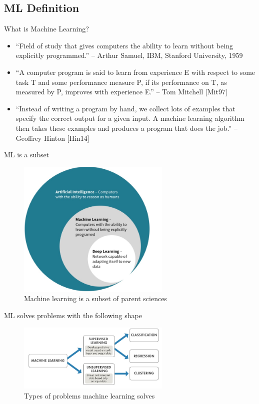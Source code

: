 \documentclass{beamer}
\begin{document}
\subsection{ML Definition}
\begin{frame}{What is Machine Learning?}
\begin{itemize}
\justifying
\item “Field of study that gives computers the ability to learn without
being explicitly programmed.” – Arthur Samuel, IBM, Stanford
University, 1959

\item “A computer program is said to learn from experience E with
respect to some task T and some performance measure P, if its
performance on T, as measured by P, improves with experience E.”
– Tom Mitchell [Mit97]

\item “Instead of writing a program by hand, we collect lots of examples
that specify the correct output for a given input. A machine
learning algorithm then takes these examples and produces a
program that does the job.” – Geoffrey Hinton [Hin14]
\end{itemize}
\end{frame}

\begin{frame}{ML is a subset}
\begin{figure}
  \centering
    \includegraphics[width=0.65\textwidth]{mlsubset}
  		\caption{ Machine learning is a subset of parent sciences }
    \label{addressingtask}
 \end{figure}
\end{frame}

\begin{frame}{ ML solves problems with the following shape }
\begin{figure}
  \centering
    \includegraphics[width=0.65\textwidth]{mldivided}
  		\caption{ Types of problems machine learning solves }
    \label{addressingtask}
 \end{figure}
\end{frame}
\end{document}
